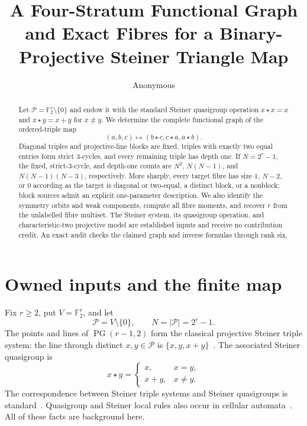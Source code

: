 \documentclass[a4paper,10pt]{amsart}
\title[Steiner triangle collapse]{A Four-Stratum Functional Graph and Exact Fibres for a Binary-Projective Steiner Triangle Map}
\author{Anonymous}
\date{}
\theoremstyle{remark}
\newcommand{\F}{\mathbb F}
\newcommand{\cP}{\mathcal P}
\begin{document}
\begin{abstract}
Let $\cP=\F_2^r\setminus\{0\}$ and endow it with the standard Steiner
quasigroup operation $x\star x=x$ and $x\star y=x+y$ for $x\ne y$.
We determine the complete functional graph of the ordered-triple map
\[
 (a,b,c)\longmapsto(b\star c,c\star a,a\star b).
\]
Diagonal triples and projective-line blocks are fixed, triples with exactly
two equal entries form strict $3$-cycles, and every remaining triple has depth
one.  If $N=2^r-1$, the fixed, strict-$3$-cycle, and depth-one counts are
$N^2$, $N(N-1)$, and $N(N-1)(N-3)$, respectively.  More sharply, every
target fibre has size $1$, $N-2$, or $0$ according as the target is diagonal
or two-equal, a distinct block, or a nonblock; block sources admit an explicit
one-parameter description.  We also identify the symmetry orbits and weak
components, compute all fibre moments, and recover $r$ from the unlabelled
fibre multiset.  The Steiner system, its quasigroup operation,
and characteristic-two projective model are established inputs and receive
no contribution credit.  An exact audit checks the claimed graph and inverse
formulas through rank six.
\end{abstract}

\maketitle

\section{Owned inputs and the finite map}\label{sec:setup}

Fix $r\ge2$, put $V=\F_2^r$, and let
\[
 \cP=V\setminus\{0\},\qquad N=|\cP|=2^r-1.
\]
The points and lines of $\operatorname{PG}(r-1,2)$ form the classical
projective Steiner triple system: the line through distinct $x,y\in\cP$ is
$\{x,y,x+y\}$~\cite{JungnickelTonchev2019,FalconeFigulaGalici2025}.
The associated Steiner quasigroup is
\begin{equation}\label{eq:star}
 x\star y=
 \begin{cases}
 x,&x=y,\\
 x+y,&x\ne y.
 \end{cases}
\end{equation}
The correspondence between Steiner triple systems and Steiner quasigroups is
standard~\cite{DrapalKozlikGriggs2012}.  Quasigroup and Steiner local rules
also occur in cellular automata~\cite{Moore1997}.  All of these facts are
background here.
\end{document}
